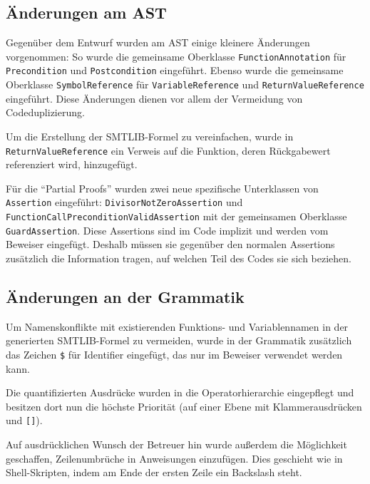 \subsection{Änderungen am AST}

Gegenüber dem Entwurf wurden am AST einige kleinere Änderungen vorgenommen: So wurde die gemeinsame Oberklasse \texttt{FunctionAnnotation} für \texttt{Precondition} und \texttt{Postcondition} eingeführt. Ebenso wurde die gemeinsame Oberklasse \texttt{SymbolReference} für \texttt{VariableReference}  und \texttt{ReturnValueReference} eingeführt. Diese Änderungen dienen vor allem der Vermeidung von Codeduplizierung.

Um die Erstellung der SMTLIB-Formel zu vereinfachen, wurde in \texttt{ReturnValueReference} ein Verweis auf die Funktion, deren Rückgabewert referenziert wird, hinzugefügt.

Für die "`Partial Proofs"' wurden zwei neue spezifische Unterklassen von \texttt{Assertion} eingeführt: \texttt{DivisorNotZeroAssertion} und \texttt{FunctionCallPreconditionValidAssertion} mit der gemeinsamen Oberklasse \texttt{GuardAssertion}. Diese Assertions sind im Code implizit und werden vom Beweiser eingefügt. Deshalb müssen sie gegenüber den normalen Assertions zusätzlich die Information tragen, auf welchen Teil des Codes sie sich beziehen.

\subsection{Änderungen an der Grammatik}

Um Namenskonflikte mit existierenden Funktions- und Variablennamen in der generierten SMTLIB-Formel zu vermeiden, wurde in der Grammatik zusätzlich das Zeichen \texttt{\$} für Identifier eingefügt, das nur im Beweiser verwendet werden kann.

Die quantifizierten Ausdrücke wurden in die Operatorhierarchie eingepflegt und besitzen dort nun die höchste Priorität (auf einer Ebene mit Klammerausdrücken und \texttt{[]}).

Auf ausdrücklichen Wunsch der Betreuer hin wurde außerdem die Möglichkeit geschaffen, Zeilenumbrüche in Anweisungen einzufügen. Dies geschieht wie in Shell-Skripten, indem am Ende der ersten Zeile ein Backslash steht.
